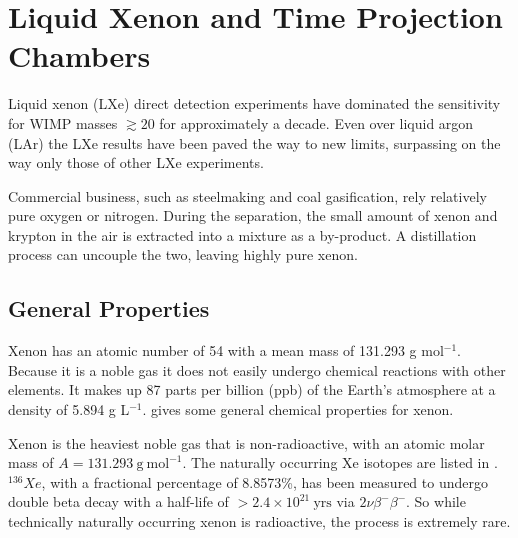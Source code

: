 

\pagestyle{cu}
\graphicspath{{./Chapter2/Figures/}}
\chapter[Liquid Xenon and Time Projection Chambers][Liquid Xenon and Time Projection Chambers]{Liquid Xenon and Time Projection Chambers}
\label{chap:liquid_xe}

Liquid xenon (LXe) direct detection experiments have dominated the sensitivity for WIMP masses $\gtrsim 20$ for approximately a
decade.  Even over liquid argon (LAr) the LXe results have been paved the way to new limits, surpassing on the way only those of other
LXe experiments.

Commercial business, such as steelmaking and coal gasification, rely relatively pure oxygen or nitrogen.  During the separation,
the small amount of xenon and krypton in the air is extracted into a mixture as a by-product.  A distillation process can uncouple
the two, leaving highly pure xenon.

\section{General Properties}
\label{sec:properties}
Xenon has an atomic number of 54 with a mean mass of 131.293 g mol$^{-1}$.  Because it is a noble gas it does not easily undergo chemical
reactions with other elements.  It makes up 87 parts per billion (ppb) of the Earth's atmosphere at a density of
5.894 g L$^{-1}$.   gives some general chemical properties for xenon.

Xenon is the heaviest noble gas that is non-radioactive, with an atomic molar mass of $A = 131.293\ \mathrm{g\ mol^{-1}}$.  The naturally
occurring Xe isotopes are listed in
.  $^{136}Xe$, with a fractional percentage of 8.8573\%,
has been measured to undergo double beta decay with a half-life of $> 2.4 \times 10^{21}\ \mathrm{yrs}$ via
$2\nu \beta^{-} \beta^{-}$.  So while technically naturally occurring xenon is radioactive, the process is extremely rare.

